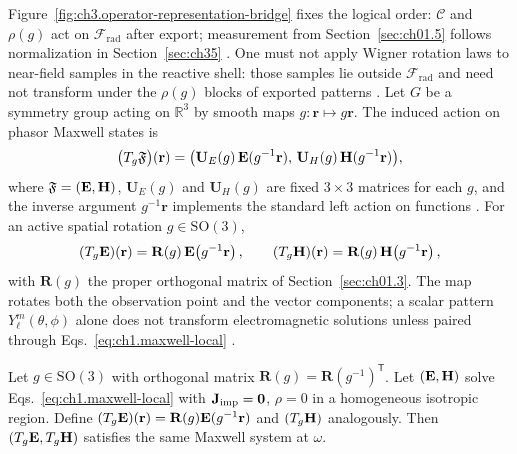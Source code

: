 Figure~\ref{fig:ch3.operator-representation-bridge} fixes the logical order: \(\mathcal{C}\) and \(\rho(g)\) act on \(\mathcal{F}_{\mathrm{rad}}\) after export; measurement from Section~\ref{sec:ch01.5} follows normalization in Section~\ref{sec:ch35} \cite{harrington2001}. One must not apply Wigner rotation laws to near-field samples in the reactive shell: those samples lie outside \(\mathcal{F}_{\mathrm{rad}}\) and need not transform under the \(\rho(g)\) blocks of exported patterns \cite{stratton1941}.
Let \(G\) be a symmetry group acting on \(\mathbb{R}^{3}\) by smooth maps \(g:\mathbf{r}\mapsto g\mathbf{r}\). The induced action on phasor Maxwell states is
\begin{equation}
\label{eq:ch3.symmetry-action-fields}
\big(T_g\mathfrak{F}\big)(\mathbf{r})
=
\big(\mathbf{U}_E(g)\,\mathbf{E}(g^{-1}\mathbf{r}),\,
\mathbf{U}_H(g)\,\mathbf{H}(g^{-1}\mathbf{r})\big),
\end{equation}
where \(\mathfrak{F}=(\mathbf{E},\mathbf{H})\), \(\mathbf{U}_E(g)\) and \(\mathbf{U}_H(g)\) are fixed \(3\times 3\) matrices for each \(g\), and the inverse argument \(g^{-1}\mathbf{r}\) implements the standard left action on functions \cite{jackson1999}. For an active spatial rotation $g\in\mathrm{SO}(3)$,
\begin{equation}
\label{eq:ch3.active-rotation-vector-field}
(T_g\mathbf{E})(\mathbf{r})=\mathbf{R}(g)\,\mathbf{E}\!\left(g^{-1}\mathbf{r}\right),
\qquad
(T_g\mathbf{H})(\mathbf{r})=\mathbf{R}(g)\,\mathbf{H}\!\left(g^{-1}\mathbf{r}\right),
\end{equation}
with $\mathbf{R}(g)$ the proper orthogonal matrix of Section~\ref{sec:ch01.3}. The map rotates both the observation point and the vector components; a scalar pattern $Y_\ell^m(\theta,\phi)$ alone does not transform electromagnetic solutions unless paired through Eqs.~\eqref{eq:ch1.maxwell-local} \cite{jackson1999,stratton1941}.
\begin{proposition}
\label{prop:ch3.maxwell-rotation-covariance}
Let $g\in\mathrm{SO}(3)$ with orthogonal matrix $\mathbf{R}(g)=\mathbf{R}(g^{-1})^{\mathsf{T}}$. Let $(\mathbf{E},\mathbf{H})$ solve Eqs.~\eqref{eq:ch1.maxwell-local} with $\mathbf{J}_{\mathrm{imp}}=\mathbf{0}$, $\rho=0$ in a homogeneous isotropic region. Define $(T_g\mathbf{E})(\mathbf{r})=\mathbf{R}(g)\mathbf{E}(g^{-1}\mathbf{r})$ and $(T_g\mathbf{H})$ analogously. Then $(T_g\mathbf{E},T_g\mathbf{H})$ satisfies the same Maxwell system at $\omega$.
\end{proposition}
